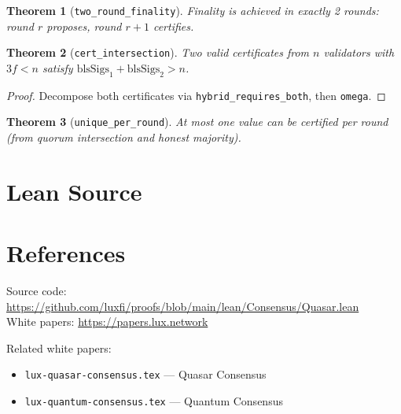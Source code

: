\documentclass[11pt]{article}
\newtheorem{theorem}{Theorem}
\begin{document}
\begin{theorem}[\texttt{two\_round\_finality}]
Finality is achieved in exactly 2 rounds: round $r$ proposes, round $r+1$ certifies.
\end{theorem}

\begin{theorem}[\texttt{cert\_intersection}]
Two valid certificates from $n$ validators with $3f < n$ satisfy $\text{blsSigs}_1 + \text{blsSigs}_2 > n$.
\end{theorem}
\begin{proof}
Decompose both certificates via \texttt{hybrid\_requires\_both}, then \texttt{omega}.
\end{proof}

\begin{theorem}[\texttt{unique\_per\_round}]
At most one value can be certified per round (from quorum intersection and honest majority).
\end{theorem}


\section{Lean Source}


\section{References}
\noindent Source code: \url{https://github.com/luxfi/proofs/blob/main/lean/Consensus/Quasar.lean}\\
\noindent White papers: \url{https://papers.lux.network}

\noindent Related white papers:
\begin{itemize}
  \item \texttt{lux-quasar-consensus.tex} --- Quasar Consensus
  \item \texttt{lux-quantum-consensus.tex} --- Quantum Consensus
\end{itemize}
\end{document}
